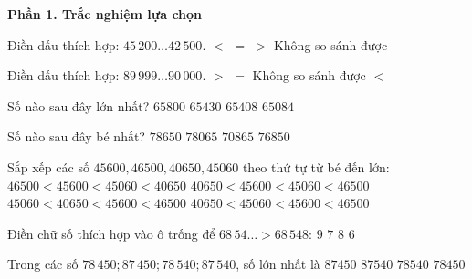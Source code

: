 \textbf{Phần 1. Trắc nghiệm lựa chọn}

\begin{ex} %
Điền dấu thích hợp: $45\,200 \dots 42\,500$.
\choice
{$<$}
{$=$}
{\True $>$}
{Không so sánh được}
\end{ex}

\begin{ex} %
Điền dấu thích hợp: $89\,999 \dots 90\,000$.
\choice
{$>$}
{$=$}
{Không so sánh được}
{\True $<$}
\end{ex}

\begin{ex} %
Số nào sau đây lớn nhất?
\choice
{\True $65800$}
{$65430$}
{$65408$}
{$65084$}
\end{ex}

\begin{ex} %
Số nào sau đây bé nhất?
\choice
{$78650$}
{$78065$}
{\True $70865$}
{$76850$}
\end{ex}

\begin{ex} %
Sắp xếp các số $45600, 46500, 40650, 45060$ theo thứ tự từ bé đến lớn:
\choice
{$46500 < 45600 < 45060 < 40650$}
{$40650 < 45600 < 45060 < 46500$}
{$45060 < 40650 < 45600 < 46500$}
{\True $40650 < 45060 < 45600 < 46500$}
\end{ex}

\begin{ex} %
Điền chữ số thích hợp vào ô trống để $68\,54\dots > 68\,548$:
\choice
{\True $9$}
{$7$}
{$8$}
{$6$}
\end{ex}

\begin{ex} %
Trong các số $78\,450; 87\,450; 78\,540; 87\,540$, số lớn nhất là
\choice
{$87450$}
{\True $87540$}
{$78540$}
{$78450$}
\end{ex}

